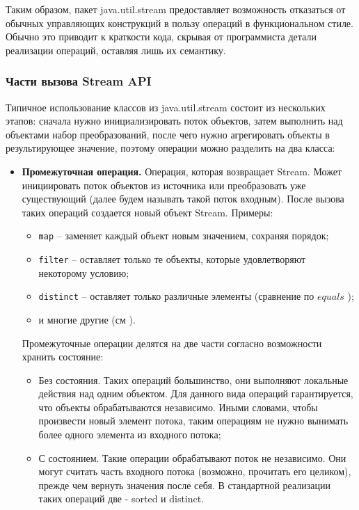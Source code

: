 Таким образом, пакет java.util.stream предоставляет возможность отказаться от обычных управляющих конструкций в пользу операций в функциональном стиле. Обычно это приводит к краткости кода, скрывая от программиста детали реализации операций, оставляя лишь их семантику.

\subsubsection{Части вызова Stream API}
Типичное использование классов из java.util.stream состоит из нескольких этапов: сначала 
нужно инициализировать поток объектов, затем выполнить над объектами набор преобразований, 
после чего нужно агрегировать объекты в результирующее значение, поэтому операции 
можно разделить на два класса:
\begin{itemize}
	\item \textbf{Промежуточная операция.} Операция, которая возвращает Stream. Может инициировать поток объектов из источника или преобразовать уже существующий (далее будем называть такой поток входным). После вызова таких операций создается новый объект Stream. Примеры:
	\begin{itemize}
		\item \texttt{map} -- заменяет каждый объект новым значением, сохраняя порядок;
		\item \texttt{filter} -- оставляет только те объекты, которые удовлетворяют некоторому условию;
		\item \texttt{distinct} -- оставляет только различные элементы (сравнение по $equals$ \cite{java:equals});
		\item и многие другие (см \cite{java:stream}).
	\end{itemize}
	Промежуточные операции делятся на две части согласно возможности хранить состояние:
	\begin{itemize}
		\item Без состояния. Таких операций большинство, они выполняют локальные действия над одним 
		объектом. Для данного вида операций гарантируется, что объекты обрабатываются независимо. Иными словами, чтобы произвести новый элемент потока, таким операциям не нужно вынимать более одного элемента из входного потока;
		\item С состоянием. Такие операции обрабатывают поток не независимо. Они могут считать часть входного потока (возможно, прочитать его целиком), прежде чем вернуть значения после себя. В стандартной реализации таких операций две - sorted и distinct.

\end{itemize}
\end{itemize}
